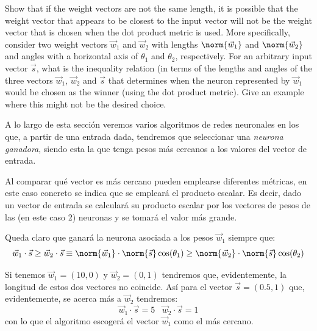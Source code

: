 \begin{problem}[1]
Show that if the weight vectors are not the same length, it is possible that the weight vector that appears to be closest to the input vector will not be the weight vector that is chosen when the dot product metric is used. More specifically, consider two weight vectors $\vec{w}_1$ and $\vec{w}_2$ with lengths $\norm{\vec{w}_1}$ and $\norm{\vec{w}_2}$ and angles with a horizontal axis of $\theta_1$ and $\theta_2$, respectively. For an arbitrary input vector $\vec{s}$, what is the inequality relation (in terms of the lengths and angles of the three vectors $\vec{w}_1$, $\vec{w}_2$ and $\vec{s}$ that determines when the neuron represented by $\vec{w}_1$ would be chosen as the winner (using the dot product metric). Give an example where this might not be the desired choice.

\solution

A lo largo de esta sección veremos varios algoritmos de redes neuronales en los que, a partir de una entrada dada, tendremos que seleccionar una \emph{neurona ganadora}, siendo esta la que tenga pesos más cercanos a los valores del vector de entrada.

Al comparar qué vector es más cercano pueden emplearse diferentes métricas, en este caso concreto se indica que se empleará el producto escalar. Es decir, dado un vector de entrada se calculará su producto escalar por los vectores de pesos de las (en este caso 2) neuronas y se tomará el valor más grande.

Queda claro que ganará la neurona asociada a los pesos $\vec{w}_1$ siempre que:
\[\vec{w}_1\cdot \vec{s} \geq \vec{w}_2\cdot \vec{s} \equiv \norm{\vec{w}_1}\cdot \norm{\vec{s}}\cos(\theta_1) \geq \norm{\vec{w}_2}\cdot \norm{\vec{s}}\cos(\theta_2)\]

Si tenemos $\vec{w}_1=(10,0)$ y $\vec{w}_2=(0,1)$ tendremos que, evidentemente, la longitud de estos dos vectores no coincide. Así para el vector $\vec{s}=(0.5,1)$ que, evidentemente, se acerca más a $\vec{w}_2$ tendremos:
\[\vec{w}_1\cdot \vec{s} = 5 \;\;\; \vec{w}_2\cdot \vec{s} = 1\]
con lo que el algoritmo escogerá el vector $\vec{w}_1$ como el más cercano.
\end{problem}

